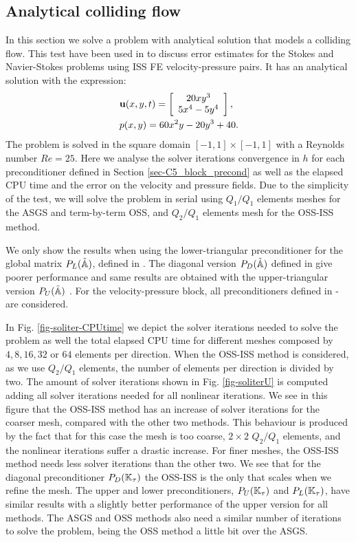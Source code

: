 \subsection{Analytical colliding flow}
\label{subsec-C5_colliding}
In this section we solve a problem with analytical solution that models a colliding flow. This test have been used in \cite{elman_finite_2005} to discuss error estimates for the Stokes and Navier-Stokes problems using ISS FE velocity-pressure pairs. It has an analytical solution with the expression:
\begin{eqnarray}
\label{eq-C5_analytical_u}
&{\bf u}(x,y,t) = \left[ \begin{array}{c}
20xy^3\\
5x^4-5y^4
\end{array}\right],\\
\label{eq-C5_analytical_p}
&p(x,y) = 60x^2y-20y^3+40.
\end{eqnarray}
The problem is solved in the square domain $[-1,1]\times[-1,1]$ with a Reynolds number $Re=25$. Here we analyse the solver iterations convergence in $h$ for each preconditioner defined in Section \ref{sec-C5_block_precond} as well as the elapsed CPU time and the error on the velocity and pressure fields. Due to the simplicity of the test, we will solve the problem in serial using $Q_1/Q_1$ elements meshes for the ASGS and term-by-term OSS, and $Q_2/Q_1$ elements mesh for the OSS-ISS method.

We only show the results when using the lower-triangular preconditioner for the global matrix $P_L(\tilde{\mathbb{A}})$, defined in . The diagonal version $P_D(\tilde{\mathbb{A}})$ defined in  give poorer performance and same results are obtained with the upper-triangular version $P_U(\tilde{\mathbb{A}})$ . For the velocity-pressure block, all preconditioners defined in - are considered.

In Fig. \ref{fig-soliter-CPUtime} we depict the solver iterations needed to solve the problem as well the total elapsed CPU time for different meshes composed by $4,8,16,32$ or $64$ elements per direction. When the OSS-ISS method is considered, as we use $Q_2/Q_1$ elements, the number of elements per direction is divided by two. The amount of solver iterations shown in Fig. \ref{fig-soliterU} is computed adding all solver iterations needed for all nonlinear iterations. We see in this figure that the OSS-ISS method has an increase of solver iterations for the coarser mesh, compared with the other two methods. This behaviour is produced by the fact that for this case the mesh is too coarse, $2\times2$ $Q_2/Q_1$ elements, and the nonlinear iterations suffer a drastic increase. For finer meshes, the OSS-ISS method needs less solver iterations than the other two. We see that for the diagonal preconditioner $P_D(\mathbb{K}_\tau)$ the OSS-ISS is the only that scales when we refine the mesh. The upper and lower preconditioners, $P_U(\mathbb{K}_\tau)$ and $P_L(\mathbb{K}_\tau)$, have similar results with a slightly better performance of the upper version for all methods. The ASGS and OSS methods also need a similar number of iterations to solve the problem, being the OSS method a little bit over the ASGS.

